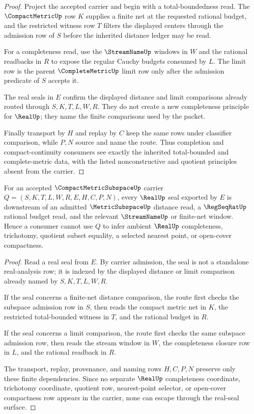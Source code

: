 \begin{proof}
Project the accepted carrier and begin with a total-boundedness read. The $\CompactMetricUp$ row $K$ supplies a finite net at the requested rational budget, and the restricted witness row $T$ filters the displayed centers through the admission row of $S$ before the inherited distance ledger may be read.

For a completeness read, use the $\StreamNameUp$ windows in $W$ and the rational readbacks in $R$ to expose the regular Cauchy budgets consumed by $L$. The limit row is the parent $\CompleteMetricUp$ limit row only after the admission predicate of $S$ accepts it.

The real seals in $E$ confirm the displayed distance and limit comparisons already routed through $S,K,T,L,W,R$. They do not create a new completeness principle for $\RealUp$; they name the finite comparisons used by the packet.

Finally transport by $H$ and replay by $C$ keep the same rows under classifier comparison, while $P,N$ source and name the route. Thus completion and compact-continuity consumers see exactly the inherited total-bounded and complete-metric data, with the listed nonconstructive and quotient principles absent from the carrier.
\end{proof}

\begin{theorem}
\label{thm:compact-metric-subspace-real-seal-nonescape}
For an accepted $\CompactMetricSubspaceUp$ carrier $Q=(S,K,T,L,W,R,E,H,C,P,N)$, every $\RealUp$ seal exported by $E$ is downstream of an admitted $\MetricSubspaceUp$ distance read, a $\RegSeqRatUp$ rational budget read, and the relevant $\StreamNameUp$ or finite-net window. Hence a consumer cannot use $Q$ to infer ambient $\RealUp$ completeness, trichotomy, quotient subset equality, a selected nearest point, or open-cover compactness.
\end{theorem}

\begin{proof}
Read a real seal from $E$. By carrier admission, the seal is not a standalone real-analysis row; it is indexed by the displayed distance or limit comparison already named by $S,K,T,L,W,R$.

If the seal concerns a finite-net distance comparison, the route first checks the subspace admission row in $S$, then reads the compact metric net in $K$, the restricted total-bounded witness in $T$, and the rational budget in $R$.

If the seal concerns a limit comparison, the route first checks the same subspace admission row, then reads the stream window in $W$, the completeness closure row in $L$, and the rational readback in $R$.

The transport, replay, provenance, and naming rows $H,C,P,N$ preserve only these finite dependencies. Since no separate $\RealUp$ completeness coordinate, trichotomy coordinate, quotient row, nearest-point selector, or open-cover compactness row appears in the carrier, none can escape through the real-seal surface.
\end{proof}


